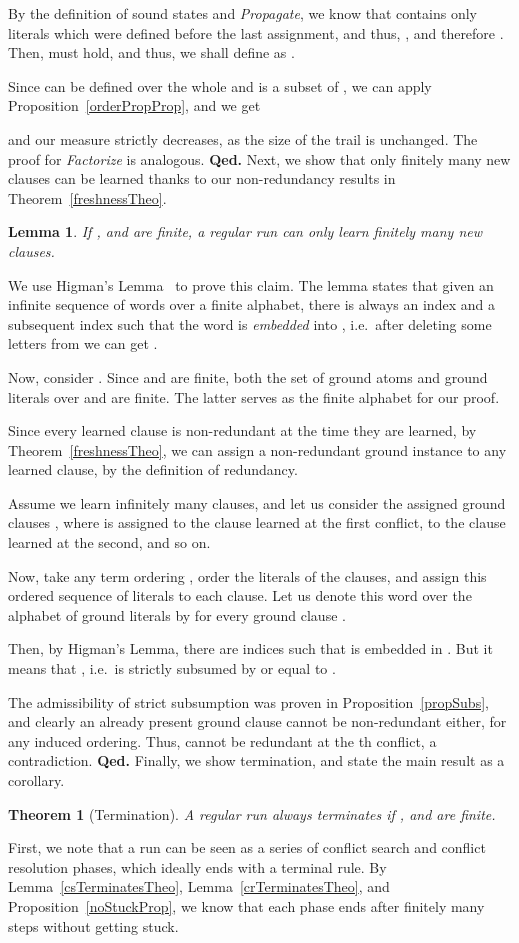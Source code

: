 \documentclass[a4paper]{article}
\newcommand{\startproof}{{\bf Proof:~}}
\newcommand{\finishproof}{{\bf Qed.}}
\newtheorem{theo}[defi]{Theorem}
\newtheorem{lemm}[defi]{Lemma}
\begin{document}
{By the definition of sound states and \emph{Propagate}, 
we know that  contains only literals which were defined before the last assignment, 
and thus, , and therefore . 
Then,  must hold, 
and thus, we shall define  as .

Since  can be defined over the whole  and  is a subset of 
, we can apply Proposition~\ref{orderPropProp}, and we get 

and our measure strictly decreases, as the size of the trail is unchanged.
The proof for \emph{Factorize} is analogous.
\finishproof\leaveabit
\noindent
Next, we show that only finitely many new clauses can be learned thanks to our non-redundancy results in Theorem~\ref{freshnessTheo}.
\begin{lemm}\label{finiteLearningTheo}
If ,  and  are finite, a regular run can only learn finitely many new clauses.
\end{lemm}
\noindent\startproof
We use Higman's Lemma~\cite{Higman52} to prove this claim.
The lemma states that given an infinite sequence  of words over a finite alphabet, there is always an index  and a subsequent index  such 
that the word  is \emph{embedded} into , i.e.\ after deleting some letters from  we can get .

Now, consider . Since  and  are finite, both the set of ground atoms and ground literals over  and  are finite.
The latter serves as the finite alphabet for our proof.

Since every learned clause is non-redundant at the time they are learned, by Theorem~\ref{freshnessTheo}, 
we can assign a non-redundant ground instance to any learned clause, by the definition of redundancy.

Assume we learn infinitely many clauses, and let us consider the assigned ground clauses , where
 is assigned to the clause learned at the first conflict,  to the clause learned at the second, and so on.

Now, take any term ordering , order the literals of the clauses, and assign this ordered sequence of literals to each clause. 
Let us denote this word over the alphabet of ground literals by  for every ground clause .

Then, by Higman's Lemma, there are indices  such that  is embedded in .
But it means that , i.e.\  is strictly subsumed by or equal to .

The admissibility of strict subsumption was proven in Proposition~\ref{propSubs}, and clearly 
an already present ground clause cannot be non-redundant either, for any induced ordering.
Thus,  cannot be redundant at the th conflict, a contradiction.
\finishproof\leaveabit
\noindent
Finally, we show termination, and state the main result as a corollary.
\begin{theo}[Termination]\label{termRunTheo}
A regular run always terminates if ,  and  are finite.
\end{theo}
\noindent\startproof 
First, we note that a run can be seen as a series of conflict search and conflict resolution phases, which ideally ends with a terminal rule.
By Lemma~\ref{csTerminatesTheo}, Lemma~\ref{crTerminatesTheo}, and Proposition~\ref{noStuckProp}, 
we know that each phase ends after finitely many steps without getting stuck. 

}
\end{document}
